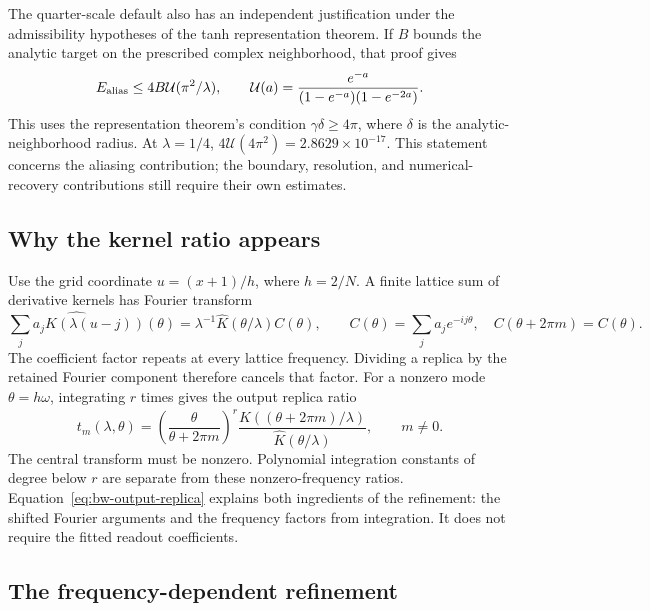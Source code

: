 \documentclass[11pt]{article}
\begin{document}
The quarter-scale default also has an independent justification under the
admissibility hypotheses of the tanh representation theorem. If $B$ bounds
the analytic target on the prescribed complex neighborhood, that proof gives
\begin{equation}
 E_{\rm alias}\le4B\mathcal U(\pi^2/\lambda),\qquad
 \mathcal U(a)=\frac{e^{-a}}{(1-e^{-a})(1-e^{-2a})}.
 \label{eq:bw-quarter-class-bound}
\end{equation}
This uses the representation theorem's condition $\gamma\delta\ge4\pi$,
where $\delta$ is the analytic-neighborhood radius.
At $\lambda=1/4$, $4\mathcal U(4\pi^2)=2.8629\times10^{-17}$.
This statement concerns the aliasing contribution; the boundary, resolution,
and numerical-recovery contributions still require their own estimates.

\subsection{Why the kernel ratio appears}
\label{app:bw-replicas}

Use the grid coordinate $u=(x+1)/h$, where $h=2/N$. A finite lattice sum of
derivative kernels has Fourier transform
\begin{equation}
 \widehat{\sum_j a_jK(\lambda(u-j))}(\theta)
 =\lambda^{-1}\widehat K(\theta/\lambda)C(\theta),\qquad
 C(\theta)=\sum_j a_je^{-ij\theta},\quad
 C(\theta+2\pi m)=C(\theta).
 \label{eq:bw-lattice-spectrum}
\end{equation}
The coefficient factor repeats at every lattice frequency. Dividing a
replica by the retained Fourier component therefore cancels that factor.
For a nonzero mode $\theta=h\omega$, integrating $r$ times gives the output
replica ratio
\begin{equation}
 t_m(\lambda,\theta)=
 \left(\frac{\theta}{\theta+2\pi m}\right)^r
 \frac{\widehat K((\theta+2\pi m)/\lambda)}
      {\widehat K(\theta/\lambda)},\qquad m\ne0.
 \label{eq:bw-output-replica}
\end{equation}
The central transform must be nonzero. Polynomial integration constants of
degree below $r$ are separate from these nonzero-frequency ratios.
Equation~\eqref{eq:bw-output-replica} explains both ingredients of the
refinement: the shifted Fourier arguments and the frequency factors from
integration. It does not require the fitted readout coefficients.

\subsection{The frequency-dependent refinement}
\label{app:bw-refined-rule}
\end{document}

